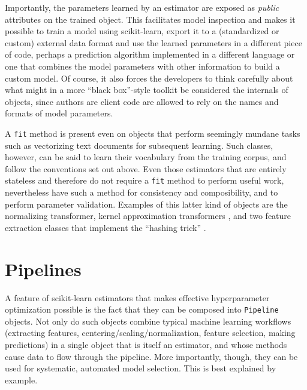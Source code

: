 \documentclass[a4paper,twocolumn]{article}
\begin{document}
Importantly, the parameters learned by an estimator
are exposed as \textit{public} attributes on the trained object.
This facilitates model inspection
and makes it possible to train a model using scikit-learn,
export it to a (standardized or custom) external data format
and use the learned parameters in a different piece of code,
perhaps a prediction algorithm implemented in a different language
or one that combines the model parameters with other information
to build a custom model.
Of course, it also forces the developers to think carefully
about what might in a more ``black box''-style toolkit
be considered the internals of objects,
since authors are client code are allowed to rely
on the names and formats of model parameters.

A \texttt{fit} method is present even on objects
that perform seemingly mundane tasks such as vectorizing text documents
for subsequent learning.
Such classes, however, can be said to learn their vocabulary
from the training corpus,
and follow the conventions set out above.
Even those estimators that are entirely stateless and therefore
do not require a \texttt{fit} method to perform useful work,
nevertheless have such a method for consistency and composibility,
and to perform parameter validation.
Examples of this latter kind of objects are the normalizing transformer,
kernel approximation transformers
\citep{rahimi2007random, li2010random, vedaldi2010efficient},
and two feature extraction classes that implement the ``hashing trick''
\citep{weinberger2009}.

\section{Pipelines}

A feature of scikit-learn estimators
that makes effective hyperparameter optimization possible
is the fact that they can be composed into \texttt{Pipeline} objects.
Not only do such objects combine typical machine learning workflows
(extracting features, centering/scaling/normalization,
feature selection, making predictions)
in a single object that is itself an estimator,
and whose methods cause data to flow through the pipeline.
More importantly, though, they can be used for
systematic, automated model selection.
This is best explained by example.
\end{document}
